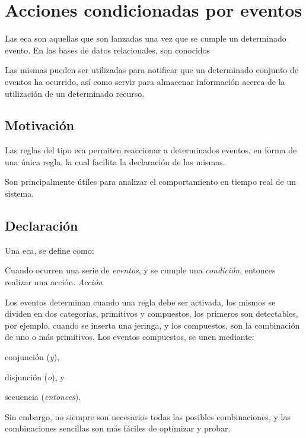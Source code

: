 

\section{Acciones condicionadas por eventos}

Las \gls{eca} son aquellas que son lanzadas una vez que se cumple un determinado
evento\cite{bailey2004event}. En las bases de datos relacionales, son conocidos



Las mismas pueden ser utilizadas para notificar que un determinado conjunto de
eventos ha ocurrido\cite{bailey2004event}, así como servir para almacenar
información acerca de la utilización de un determinado recurso.

\subsection{Motivación}

Las reglas del tipo \gls{eca} permiten reaccionar a determinados eventos, en
forma de una única regla, la cual facilita la declaración de las
mismas\cite{bailey2004event}.

Son principalmente útiles para analizar el comportamiento en tiempo real de un
sistema\cite{bailey2004event}.



\subsection{Declaración}

Una \gls{eca}, se define como:

\begin{center}
	 Cuando ocurren una serie de \emph{eventos}, y se cumple una
	 \emph{condición}, entonces realizar una acción. \emph{Acción}
\end{center}

Los eventos determinan cuando una regla debe ser activada, los mismos se dividen
en dos categorías, primitivos y compuestos, los primeros son detectables, por
ejemplo, cuando se inserta una jeringa, y los compuestos, son la combinación de
uno o más primitivos\cite{bailey2004event}. Los eventos compuestos, se unen
mediante:
\begin{enumerate*}[label=\itshape\alph*\upshape)]
\item conjunción (\emph{y}),
\item disjunción (\emph{o}), y
\item secuencia (\emph{entonces}).
\end{enumerate*}
Sin embargo, no siempre son necesarios todas las posibles combinaciones, y las
combinaciones sencillas son más fáciles de optimizar y
probar\cite{bailey2004event}.

